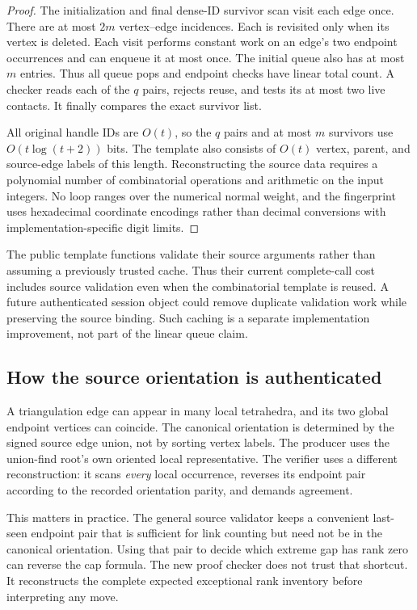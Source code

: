 \begin{proof}
The initialization and final dense-ID survivor scan visit each edge once.
There are at most $2m$ vertex--edge incidences. Each is revisited only when
its vertex is deleted. Each visit performs constant work on an edge's two
endpoint occurrences and can enqueue it at most once. The initial queue
also has at most $m$ entries. Thus all queue pops and endpoint checks have
linear total count. A checker reads each of the $q$ pairs, rejects reuse,
and tests its at most two live contacts. It finally compares the exact
survivor list.

All original handle IDs are $O(t)$, so the $q$ pairs and at most $m$
survivors use $O(t\log(t+2))$ bits. The template also consists of $O(t)$
vertex, parent, and source-edge labels of this length. Reconstructing the
source data requires a polynomial number of combinatorial operations and
arithmetic on the input integers. No loop ranges over the numerical normal
weight, and the fingerprint uses hexadecimal coordinate encodings rather
than decimal conversions with implementation-specific digit limits.
\end{proof}

The public template functions validate their source arguments rather than
assuming a previously trusted cache. Thus their current complete-call cost
includes source validation even when the combinatorial template is reused.
A future authenticated session object could remove duplicate validation
work while preserving the source binding. Such caching is a separate
implementation improvement, not part of the linear queue claim.

\subsection{How the source orientation is authenticated}

A triangulation edge can appear in many local tetrahedra, and its two global
endpoint vertices can coincide. The canonical orientation is determined by
the signed source edge union, not by sorting vertex labels. The producer
uses the union-find root's own oriented local representative. The verifier
uses a different reconstruction: it scans \emph{every} local occurrence,
reverses its endpoint pair according to the recorded orientation parity,
and demands agreement.

This matters in practice. The general source validator keeps a convenient
last-seen endpoint pair that is sufficient for link counting but need not
be in the canonical orientation. Using that pair to decide which extreme
gap has rank zero can reverse the cap formula. The new proof checker does
not trust that shortcut. It reconstructs the complete expected exceptional
rank inventory before interpreting any move.

